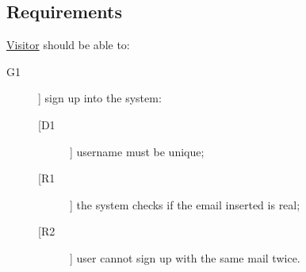\subsection{Requirements}

\underline{Visitor} should be able to:
\begin{description}
\item[G1]] sign up into the system:
	\begin{description}
	\item[[D1]] username must be unique;
	\newline
	\item[[R1]] the system checks if the email inserted is real;
	\item[[R2]] user cannot sign up with the same mail twice.
	\end{description}
\end{description}

